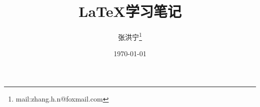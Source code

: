 \documentclass[UTF8, a4paper]{ctexart}
\title{LaTeX学习笔记}
\author{张洪宁\thanks{mail:zhang.h.n@foxmail.com}}
\date{\today}
\begin{document}
\maketitle
\newpage
\raggedright






\newpage

\printindex
\end{document}
